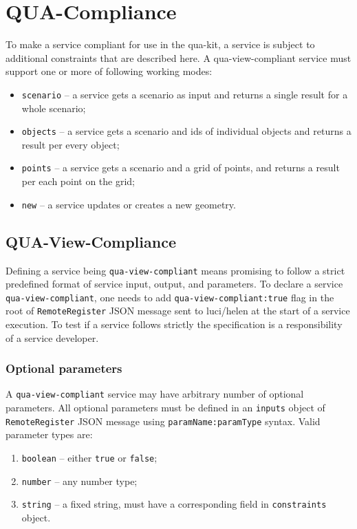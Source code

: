 \section{QUA-Compliance}
\label{ch:quacompliance}

To make a service compliant for use in the qua-kit, a service is subject to additional constraints that are described here.
A qua-view-compliant service must support one or more of following working modes:
\begin{itemize}
\item 
    \texttt{scenario} -- a service gets a scenario as input and returns a single result for a whole scenario;
\item 
    \texttt{objects} -- a service gets a scenario and ids of individual objects and returns a result per every object;
\item 
    \texttt{points} -- a service gets a scenario and a grid of points, and returns a result per each point on the grid;
\item 
    \texttt{new} -- a service updates or creates a new geometry.
\end{itemize}

\subsection{QUA-View-Compliance}

Defining a service being
\texttt{qua-view-compliant} means promising to follow a strict predefined format of service input, output, and parameters.
To declare a service \texttt{qua-view-compliant}, one needs to add \texttt{qua-view-compliant:true} flag in the root
of \texttt{RemoteRegister} JSON message sent to luci/helen at the start of a service execution.
To test if a service follows strictly the specification is a responsibility of a service developer.

\subsubsection{Optional parameters}

A \texttt{qua-view-compliant} service may have arbitrary number of optional parameters.
All optional parameters must be defined in an \texttt{inputs} object of \texttt{RemoteRegister} JSON message
using \texttt{paramName:paramType} syntax.
Valid parameter types are:
\begin{enumerate}
\item \texttt{boolean} -- either \texttt{true} or \texttt{false};
\item \texttt{number} -- any number type;
\item \texttt{string} -- a fixed string, must have a corresponding field in \texttt{constraints} object.
\end{enumerate}

